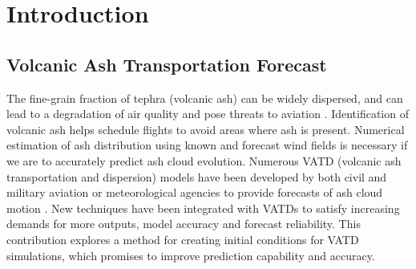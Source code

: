 \documentclass[draft,linenumbers]{agujournal2019}
\begin{document}
%
%

\section{Introduction}

\subsection{Volcanic Ash Transportation Forecast}
The fine-grain fraction of tephra (volcanic ash) can be widely dispersed, and can lead to a degradation of air quality and pose threats to aviation \citep{tupper2007facing}. Identification of volcanic ash helps schedule flights to avoid areas where ash is present. Numerical estimation of ash distribution using known and forecast wind fields is necessary if we are to accurately predict ash cloud evolution. Numerous VATD (volcanic ash transportation and dispersion) models have been developed by both civil and military aviation or meteorological agencies to provide forecasts of ash cloud motion \citep{witham2007comparison}. New techniques have been integrated with VATDs to satisfy increasing demands for more outputs, model accuracy and forecast reliability. This contribution explores a method for creating initial conditions for VATD simulations, which promises to improve prediction capability and accuracy.
\end{document}
